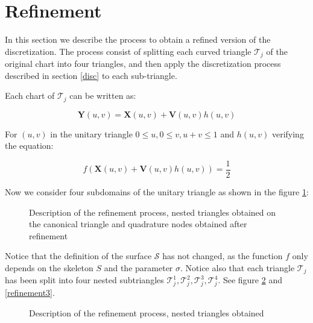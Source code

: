 \documentclass[11pt, oneside]{article}
\newcommand\bX{\boldsymbol X}
\newcommand\bY{\boldsymbol Y}
\newcommand\bV{\boldsymbol V}
\begin{document}
\section{Refinement}

In this section we describe the process to obtain a refined version of the discretization. The process consist of splitting each curved triangle  $\mathcal{T}_j$ of the original chart into four triangles, and then apply the discretization process described in section \ref{disc} to each sub-triangle.

Each chart of $\mathcal{T}_j$ can be written as:

\begin{equation}
\bY(u,v)=\bX(u,v)+\bV(u,v)h(u,v)
\end{equation}

For $(u,v)$ in the unitary triangle $0\le u, 0\le v, u+v\le1$ and $h(u,v)$ verifying the equation:

\begin{equation}
f(\bX(u,v)+\bV(u,v)h(u,v))=\frac{1}{2}
\end{equation}

Now we consider four subdomains of the unitary triangle as shown in the figure \ref{refinement1}:

\begin{figure}[H]
\begin{center}
\end{center}
\caption{Description of the refinement process, nested triangles obtained on the canonical triangle and quadrature nodes obtained after refinement}
\label{refinement1}
\end{figure}

Notice that the definition of the surface $\mathcal{S}$ has not changed, as the function $f$ only depends on the skeleton $\mathit{S}$ and the parameter $\sigma$. Notice also that each triangle $\mathcal{T}_j$ has been split into four nested subtriangles $\mathcal{T}_j^1,\mathcal{T}_j^2,\mathcal{T}_j^3,\mathcal{T}_j^4$. See figure \ref{refinement2} and \ref{refinement3}.

\begin{figure}[H]
\begin{center}
\end{center}
\caption{Description of the refinement process, nested triangles obtained}
\label{refinement2}
\end{figure}
\end{document}
